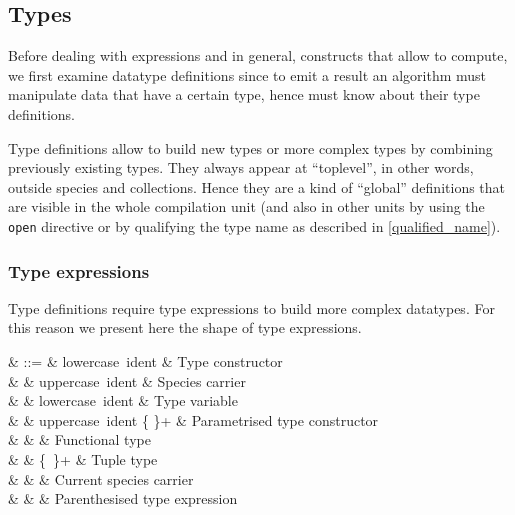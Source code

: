 \subsection{Types}
Before dealing with expressions and in general, constructs that allow
to compute, we first examine datatype definitions since to emit a
result an algorithm must manipulate data that have a certain type,
hence must know about their type definitions.

Type definitions allow to build new types or more complex types by
combining previously existing types. They always appear at
``toplevel'', in other words, outside species and collections. Hence
they are a kind of ``global'' definitions that are visible in the
whole compilation unit (and also in other units by using the
{\tt open} directive or by qualifying the type name as described in
\ref{qualified_name}).



\subsubsection{Type expressions}
Type definitions require type expressions to build more complex
datatypes. For this reason we present here the shape of type
expressions.

\vspace{0.2cm}
\begin{syntax}
\tau & ::= & lowercase\ ident   & Type constructor \\
     & \mid & uppercase\ ident & Species carrier \\
     & \mid & lowercase\ ident & Type variable \\
     & \mid & uppercase\ ident
              \terminal{(}\tau \{\terminal{,} \tau\}+\terminal{)} &
               Parametrised type constructor \\
     & \mid & \tau \terminal{\rightarrow} \tau & Functional type \\
     & \mid & \terminal{(}\tau \terminal{*} \tau
              \{\terminal{*}\ \tau\}+\terminal{)} & Tuple type \\
     & \mid &  & Current species carrier \\
     & \mid & \terminal{(}\tau\terminal{)} & Parenthesised type expression
\end{syntax}
\vspace{0.2cm}

